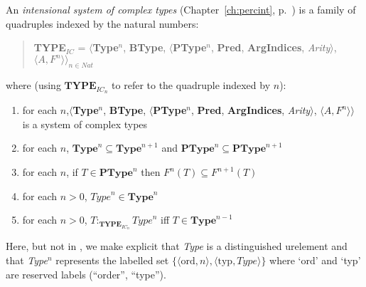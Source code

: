 
An {\it intensional system of complex types\/}
(Chapter~\ref{ch:percint}, p.~\pageref{ex:int-type-sys}) is a family of
quadruples indexed by the natural numbers:
\begin{quote}
{\bf TYPE$_\mathit{IC}$} = $\langle${\bf Type}$^n$, {\bf BType},
$\langle$\textbf{PType}$^n$, {\bf Pred}, \textbf{ArgIndices}, {\it
  Arity\/}$\rangle$, $\langle A,F^n\rangle$$\rangle_{n\in\mathit{Nat}}$
\end{quote}
where (using $\mathbf{TYPE}_{\mathit{IC}_n}$ to refer to the quadruple
indexed by $n$):
\begin{enumerate} 
 
\item for each $n$,$\langle${\bf Type}$^n$, {\bf BType},
$\langle$\textbf{PType}$^n$, {\bf Pred}, \textbf{ArgIndices}, {\it
  Arity\/}$\rangle$, $\langle A,F^n\rangle$$\rangle$ is a 
system of complex types  
 
\item for each $n$, $\mathbf{Type}^n\subseteq\mathbf{Type}^{n+1}$ and
  $\mathbf{PType}^n\subseteq\mathbf{PType}^{n+1}$

\item for each $n$, if $T\in\mathbf{PType}^n$ then $F^n(T)\subseteq F^{n+1}(T)$%

\item for each $n>0$, $\mathit{Type}^n\in\mathbf{Type}^n$

\item for each $n>0$,
  $T:_{\mathbf{TYPE}_{\mathit{IC}_n}}\mathit{Type}^n$ iff $T\in\mathbf{Type}^{n-1}$
 
\end{enumerate}

Here, but not in \cite{Cooper2012}, we make explicit that
\textit{Type} is a distinguished urelement and that \textit{Type}$^n$
represents the labelled set
$\{\langle\mathrm{ord},n\rangle,\langle\mathrm{typ},\mathit{Type}\rangle\}$
where `ord' and `typ' are reserved labels (``order'', ``type'').


